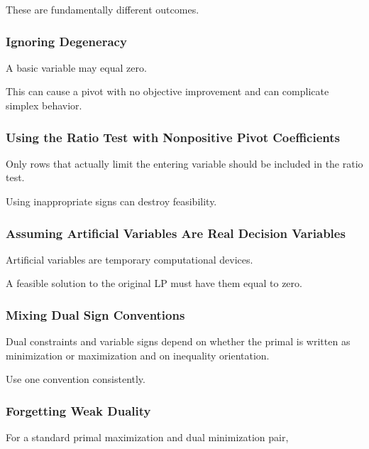 These are fundamentally different outcomes.

\subsubsection{Ignoring Degeneracy}

A basic variable may equal zero.

This can cause a pivot with no objective improvement and can complicate
simplex behavior.

\subsubsection{Using the Ratio Test with Nonpositive Pivot Coefficients}

Only rows that actually limit the entering variable should be included in
the ratio test.

Using inappropriate signs can destroy feasibility.

\subsubsection{Assuming Artificial Variables Are Real Decision Variables}

Artificial variables are temporary computational devices.

A feasible solution to the original LP must have them equal to zero.

\subsubsection{Mixing Dual Sign Conventions}

Dual constraints and variable signs depend on whether the primal is
written as minimization or maximization and on inequality orientation.

Use one convention consistently.

\subsubsection{Forgetting Weak Duality}

For a standard primal maximization and dual minimization pair,

